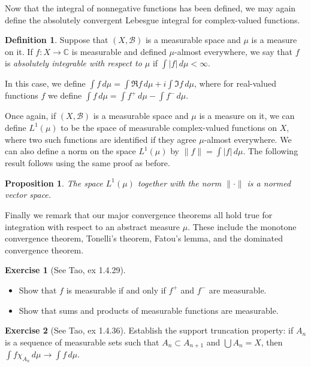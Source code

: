 \documentclass[10pt,oneside]{amsbook}
\newcommand{\CC}{{\mathbb C}}
\theoremstyle{definition}
\newtheorem{exerc}{Exercise}[section]
\theoremstyle{plain}
\newtheorem{prop}[thm]{Proposition}
\theoremstyle{definition}
\newtheorem{defn}[thm]{Definition}
\theoremstyle{remark}
\numberwithin{equation}{section}
\numberwithin{figure}{section}
\begin{document}
Now that the integral of nonnegative functions has been defined, we may again define the absolutely convergent Lebesgue integral for complex-valued functions.

\begin{defn}
  Suppose that $(X,\mathcal B)$ is a measurable space and $\mu$ is a measure on it. If $f\colon X\to\CC$ is measurable and defined $\mu$-almost everywhere, we say that $f$ is \emph{absolutely integrable with respect to $\mu$} if $\int|f|\,d\mu<\infty$.

  In this case, we define $\int f\,d\mu=\int\Re f\,d\mu+i\int\Im f\,d\mu$, where for real-valued functions $f$ we define $\int f\,d\mu=\int f^+\,d\mu-\int f^-\,d\mu$.
\end{defn}

Once again, if $(X,\mathcal B)$ is a measurable space and $\mu$ is a measure on it, we can define $L^1(\mu)$ to be the space of measurable complex-valued functions on $X$, where two such functions are identified if they agree $\mu$-almost everywhere. We can also define a norm on the space $L^1(\mu)$ by $\|f\|=\int|f|\,d\mu$. The following result follows using the same proof as before.

\begin{prop}
  The space $L^1(\mu)$ together with the norm $\|\cdot\|$ is a normed vector space.
\end{prop}

Finally we remark that our major convergence theorems all hold true for integration with respect to an abstract measure $\mu$. These include the monotone convergence theorem, Tonelli's theorem, Fatou's lemma, and the dominated convergence theorem.

\begin{exerc}[See Tao, ex 1.4.29]
  \begin{itemize}
    \item Show that $f$ is measurable if and only if $f^+$ and $f^-$ are measurable.
    \item Show that sums and products of measurable functions are measurable.
  \end{itemize}
\end{exerc}

\begin{exerc}[See Tao, ex 1.4.36]
  Establish the support truncation property: if $A_n$ is a sequence of measurable sets such that $A_n\subset A_{n+1}$ and $\bigcup A_n=X$, then $\int f\chi_{A_n}\,d\mu\to\int f\,d\mu$.
\end{exerc}




\end{document}
